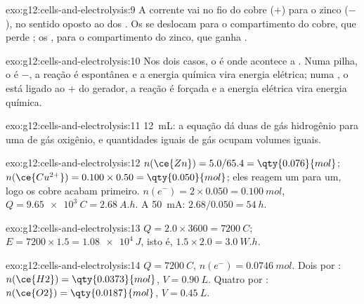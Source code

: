 \begin{solution}{exo:g12:cells-and-electrolysis:9}
A corrente vai no fio do cobre ($+$) para o zinco ($-$), no sentido
oposto ao dos . Os   se deslocam para o compartimento
do cobre, que perde ; os  , para o
compartimento do zinco, que ganha .
\end{solution}

\begin{solution}{exo:g12:cells-and-electrolysis:10}
Nos dois casos, o  é onde acontece a . Numa pilha, o 
é $-$, a reação é espontânea e a energia química vira energia elétrica;
numa , o  está ligado ao $+$ do gerador, a reação é
forçada e a energia elétrica vira energia química.
\end{solution}

\begin{solution}{exo:g12:cells-and-electrolysis:11}
\qty{12}{mL}: a equação  dá duas  de gás
hidrogênio para uma de gás oxigênio, e quantidades iguais de gás ocupam
volumes iguais.
\end{solution}

\begin{solution}{exo:g12:cells-and-electrolysis:12}
$n(\ce{Zn}) = 5.0/65.4 = \qty{0.076}{mol}$;
$n(\ce{Cu^{2+}}) = 0.100 \times 0.50 = \qty{0.050}{mol}$; eles reagem um
para um, logo os  cobre acabam primeiro. $n(e^-) = 2 \times 0.050
= \qty{0.100}{mol}$, $Q = \qty{9.65e3}{C} = \qty{2.68}{A.h}$. A
\qty{50}{mA}: $2.68/0.050 = \qty{54}{h}$.
\end{solution}

\begin{solution}{exo:g12:cells-and-electrolysis:13}
$Q = 2.0 \times 3600 = \qty{7200}{C}$; $E = 7200 \times 1.5 =
\qty{1.08e4}{J}$, isto é, $1.5 \times 2.0 = \qty{3.0}{W.h}$.
\end{solution}

\begin{solution}{exo:g12:cells-and-electrolysis:14}
$Q = \qty{7200}{C}$, $n(e^-) = \qty{0.0746}{mol}$. Dois  por
: $n(\ce{H2}) = \qty{0.0373}{mol}$, $V = \qty{0.90}{L}$. Quatro
por : $n(\ce{O2}) = \qty{0.0187}{mol}$, $V = \qty{0.45}{L}$.
\end{solution}

